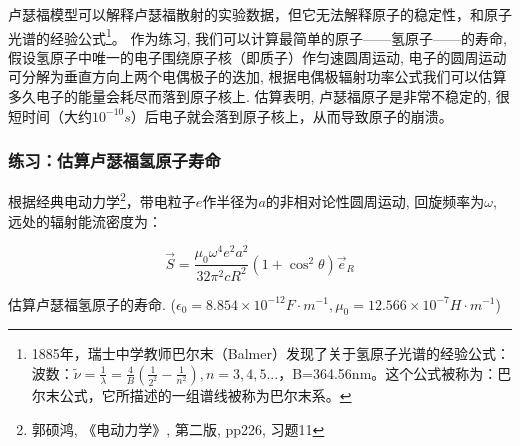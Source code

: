 卢瑟福模型可以解释卢瑟福散射的实验数据，但它无法解释原子的稳定性，和原子光谱的经验公式\footnote{1885年，瑞士中学教师巴尔末（Balmer）发现了关于氢原子光谱的经验公式：\\
波数：$\tilde \nu  = \frac{1}{\lambda } = \frac{4}{B}\left(
{\frac{1}{{2^2 }} - \frac{1}{{n^2 }}} \right),n =
3,4,5...$，B=364.56nm。这个公式被称为：巴尔末公式，它所描述的一组谱线被称为巴尔末系。}。
作为练习, 我们可以计算最简单的原子——氢原子——的寿命,
假设氢原子中唯一的电子围绕原子核（即质子）作匀速圆周运动,
电子的圆周运动可分解为垂直方向上两个电偶极子的迭加,
根据电偶极辐射功率公式我们可以估算多久电子的能量会耗尽而落到原子核上.
估算表明, 卢瑟福原子是非常不稳定的, 很短时间（大约$10^{-10}
s$）后电子就会落到原子核上，从而导致原子的崩溃。


\subsubsection*{练习：估算卢瑟福氢原子寿命}

根据经典电动力学\footnote{郭硕鸿, 《电动力学》, 第二版, pp226,
习题11}，带电粒子$e$作半径为$a$的非相对论性圆周运动,
回旋频率为$\omega$, 远处的辐射能流密度为：

\begin{equation*}
\vec S=\frac{\mu_0 \omega^4 e^2 a^2}{32\pi^2 c R^2} (1+\cos^2
\theta) \vec e_R
\end{equation*}


估算卢瑟福氢原子的寿命. ($\epsilon_0 = 8.854 \times 10^{-12} F \cdot
m^{-1}, \mu_0 = 12.566 \times 10^{-7} H \cdot m^{-1}$)

